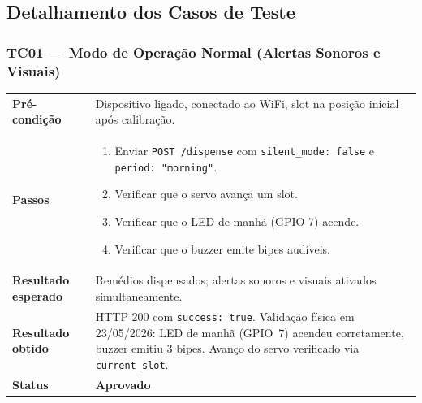 \documentclass[12pt,a4paper]{article}
\newcommand{\lightrule}{\arrayrulecolor{gray!35}\midrule\arrayrulecolor{black}}
\newcommand{\aprovado}{\textcolor{green!60!black}{\textbf{Aprovado}}}
\begin{document}
\subsection{Detalhamento dos Casos de Teste}

\subsubsection{TC01 — Modo de Operação Normal (Alertas Sonoros e Visuais)}
\begin{table}[H]\small\setlength{\tabcolsep}{6pt}\renewcommand{\arraystretch}{1.3}
\begin{tabularx}{\textwidth}{>{\bfseries}p{4cm} X}
\toprule
Pré-condição & Dispositivo ligado, conectado ao WiFi, slot na posição inicial após calibração. \\
\lightrule
Passos &
\begin{enumerate}[nosep,leftmargin=*]
  \item Enviar \texttt{POST /dispense} com \texttt{silent\_mode: false} e \texttt{period: "morning"}.
  \item Verificar que o servo avança um slot.
  \item Verificar que o LED de manhã (GPIO 7) acende.
  \item Verificar que o buzzer emite bipes audíveis.
\end{enumerate} \\
\lightrule
Resultado esperado & Remédios dispensados; alertas sonoros e visuais ativados simultaneamente. \\
\lightrule
Resultado obtido & HTTP 200 com \texttt{success: true}. Validação física em 23/05/2026: LED de manhã (GPIO~7) acendeu corretamente, buzzer emitiu 3 bipes. Avanço do servo verificado via \texttt{current\_slot}. \\
\lightrule
Status & \aprovado \\
\bottomrule
\end{tabularx}\end{table}
\end{document}
